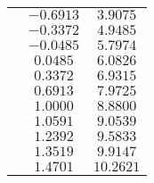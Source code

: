 \documentclass[9pt,twocolumn,twoside]{optica}
\begin{document}
\begin{table}[H]
\begin{tabular}{ccc}
		&   $-0.6913 $        & $ 3.9075 $\\ 
		&   $-0.3372 $        & $ 4.9485 $\\
		&   $-0.0485 $        & $ 5.7974 $\\
		&   $ 0.0485 $        & $ 6.0826 $\\
		&   $ 0.3372 $        & $ 6.9315 $\\
		&   $ 0.6913 $        & $ 7.9725 $\\
		&   $ 1.0000 $        & $ 8.8800 $\\
		&   $ 1.0591 $        & $ 9.0539 $\\
		&   $ 1.2392 $        & $ 9.5833 $\\ 
		&   $ 1.3519 $        & $ 9.9147 $\\
		&   $ 1.4701 $        & $10.2621 $\\
		\hline
\end{tabular}
  \label{tab:huck1}
\end{table}
\end{document}
